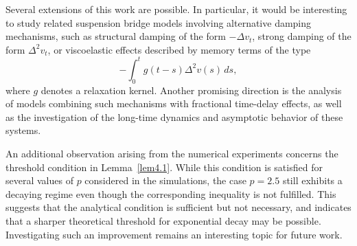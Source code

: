 \documentclass[12pt]{article}
\numberwithin{equation}{section}
\begin{document}
Several extensions of this work are possible. In particular, it would be
interesting to study related suspension bridge models involving alternative
damping mechanisms, such as structural damping of the form $-\Delta v_t$,
strong damping of the form $\Delta^2 v_t$, or viscoelastic effects described by
memory terms of the type
\[
-\int_0^t g(t-s)\Delta^2 v(s)\,ds,
\]
where $g$ denotes a relaxation kernel. Another promising direction is the
analysis of models combining such mechanisms with fractional time-delay
effects, as well as the investigation of the long-time dynamics and asymptotic
behavior of these systems.

An additional observation arising from the numerical experiments concerns
the threshold condition in Lemma~\ref{lem4.1}. While this condition is
satisfied for several values of $p$ considered in the simulations, the case
$p=2.5$ still exhibits a decaying regime even though the corresponding
inequality is not fulfilled. This suggests that the analytical condition is
sufficient but not necessary, and indicates that a sharper theoretical
threshold for exponential decay may be possible. Investigating such an
improvement remains an interesting topic for future work.
\end{document}
